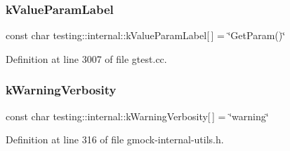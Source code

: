 \subsubsection{\texorpdfstring{k\+Value\+Param\+Label}{kValueParamLabel}}
{\footnotesize\ttfamily const char testing\+::internal\+::k\+Value\+Param\+Label\mbox{[}$\,$\mbox{]} = \char`\"{}Get\+Param()\char`\"{}\hspace{0.3cm}{\ttfamily [static]}}



Definition at line 3007 of file gtest.\+cc.

\mbox{\label{namespacetesting_1_1internal_ad9386ccda6b6deac2f7b84784d3088c0}} 
\subsubsection{\texorpdfstring{k\+Warning\+Verbosity}{kWarningVerbosity}}
{\footnotesize\ttfamily const char testing\+::internal\+::k\+Warning\+Verbosity\mbox{[}$\,$\mbox{]} = \char`\"{}warning\char`\"{}}



Definition at line 316 of file gmock-\/internal-\/utils.\+h.

